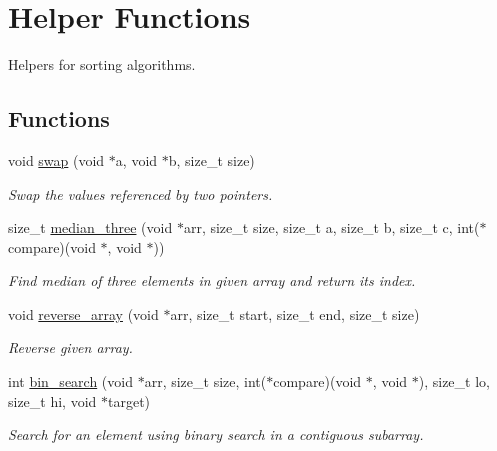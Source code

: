 \hypertarget{group__SortingHelper}{}\section{Helper Functions}
\label{group__SortingHelper}


Helpers for sorting algorithms.  


\subsection*{Functions}
\begin{DoxyCompactItemize}
\item 
void \hyperlink{group__SortingHelper_gac005eaa05ec80dbf1a0984d3d4fa80a8}{swap} (void $\ast$a, void $\ast$b, size\+\_\+t size)
\begin{DoxyCompactList}\small\item\em Swap the values referenced by two pointers. \end{DoxyCompactList}\item 
size\+\_\+t \hyperlink{group__SortingHelper_ga64dc225cd385660f0c413520416e8d40}{median\+\_\+three} (void $\ast$arr, size\+\_\+t size, size\+\_\+t a, size\+\_\+t b, size\+\_\+t c, int($\ast$compare)(void $\ast$, void $\ast$))
\begin{DoxyCompactList}\small\item\em Find median of three elements in given array and return its index. \end{DoxyCompactList}\item 
void \hyperlink{group__SortingHelper_gae26181b67ffd4261a676f39624c3ce68}{reverse\+\_\+array} (void $\ast$arr, size\+\_\+t start, size\+\_\+t end, size\+\_\+t size)
\begin{DoxyCompactList}\small\item\em Reverse given array. \end{DoxyCompactList}\item 
int \hyperlink{group__SortingHelper_ga5f3f53398f1206d95119c4ba54faab58}{bin\+\_\+search} (void $\ast$arr, size\+\_\+t size, int($\ast$compare)(void $\ast$, void $\ast$), size\+\_\+t lo, size\+\_\+t hi, void $\ast$target)
\begin{DoxyCompactList}\small\item\em Search for an element using binary search in a contiguous subarray. \end{DoxyCompactList}\end{DoxyCompactItemize}


